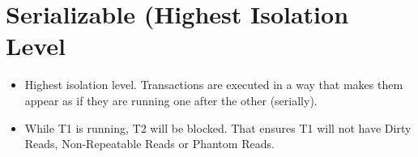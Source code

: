 \section*{Serializable (Highest Isolation Level}
\begin{itemize}
\item Highest isolation level. Transactions are executed in a way that makes them appear as if they are running one after the other (serially).
\item While T1 is running, T2 will be blocked. That ensures T1 will not have Dirty Reads, Non-Repeatable Reads or Phantom Reads.
\end{itemize}


